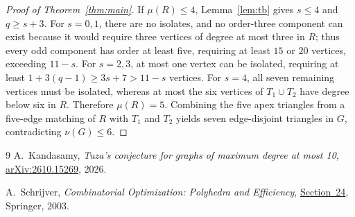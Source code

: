 \documentclass[11pt]{article}
\begin{document}
\begin{proof}[Proof of Theorem~\ref{thm:main}]
If $\mu(R)\leq 4$, Lemma~\ref{lem:tb} gives $s\leq 4$ and $q\geq s+3$. For $s=0,1$, there are no isolates, and no order-three component can exist because it would require three vertices of degree at most three in $R$; thus every odd component has order at least five, requiring at least $15$ or $20$ vertices, exceeding $11-s$. For $s=2,3$, at most one vertex can be isolated, requiring at least $1+3(q-1)\geq 3s+7>11-s$ vertices. For $s=4$, all seven remaining vertices must be isolated, whereas at most the six vertices of $T_1\cup T_2$ have degree below six in $R$. Therefore $\mu(R)=5$. Combining the five apex triangles from a five-edge matching of $R$ with $T_1$ and $T_2$ yields seven edge-disjoint triangles in $G$, contradicting $\nu(G)\leq 6$.
\end{proof}

\begin{thebibliography}{9}
A.~Kandasamy, \emph{Tuza's conjecture for graphs of maximum degree at most 10},
\href{https://arxiv.org/abs/2610.15269}{arXiv:2610.15269}, 2026.

A.~Schrijver, \emph{Combinatorial Optimization: Polyhedra and Efficiency},
\href{https://www.lamsade.dauphine.fr/~cornaz/Enseignement/M2_MODO/DATA/A3.PDF}{Section~24}, Springer, 2003.
\end{thebibliography}
\end{document}
